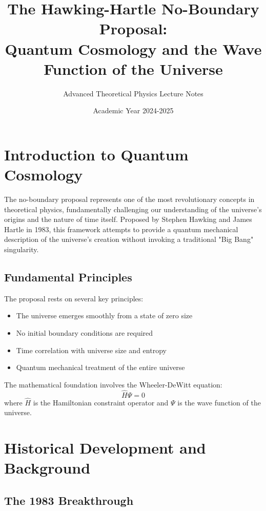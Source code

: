 \documentclass[12pt,a4paper]{article}
\title{\textbf{The Hawking-Hartle No-Boundary Proposal: \\
Quantum Cosmology and the Wave Function of the Universe}}
\author{Advanced Theoretical Physics Lecture Notes}
\date{Academic Year 2024-2025}
\begin{document}
\maketitle

\tableofcontents
\newpage

\section{Introduction to Quantum Cosmology}

The no-boundary proposal represents one of the most revolutionary concepts in theoretical physics, fundamentally challenging our understanding of the universe's origins and the nature of time itself. Proposed by Stephen Hawking and James Hartle in 1983, this framework attempts to provide a quantum mechanical description of the universe's creation without invoking a traditional "Big Bang" singularity.

\subsection{Fundamental Principles}

The proposal rests on several key principles:
\begin{itemize}
    \item The universe emerges smoothly from a state of zero size
    \item No initial boundary conditions are required
    \item Time correlation with universe size and entropy
    \item Quantum mechanical treatment of the entire universe
\end{itemize}

The mathematical foundation involves the Wheeler-DeWitt equation:
\begin{equation}
\hat{H}\Psi = 0
\end{equation}
where $\hat{H}$ is the Hamiltonian constraint operator and $\Psi$ is the wave function of the universe.

\section{Historical Development and Background}

\subsection{The 1983 Breakthrough}
\end{document}
